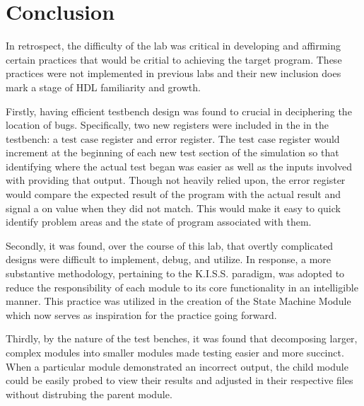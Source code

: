 \documentclass[stu,12pt,floatsintext]{apa7}
\begin{document}
\section{Conclusion}

%
%

In retrospect, the difficulty of the lab was critical in developing and affirming certain practices that would be critial to achieving the target program. These practices were not implemented in previous labs and their new inclusion does mark a stage of HDL familiarity and growth.

Firstly, having efficient testbench design was found to crucial in deciphering the location of bugs. Specifically, two new registers were included in the in the testbench: a \(\text{test case}\) register and \(\text{error}\) register. The \(\text{test case}\) register would increment at the beginning of each new test section of the simulation so that identifying where the actual test began was easier as well as the inputs involved with providing that output. Though not heavily relied upon, the \(\text{error}\) register would compare the expected result of the program with the actual result and signal a on value when they did not match. This would make it easy to quick identify problem areas and the state of program associated with them.

Secondly, it was found, over the course of this lab, that overtly complicated designs were difficult to implement, debug, and utilize. In response, a more substantive methodology, pertaining to the K.I.S.S. paradigm, was adopted to reduce the responsibility of each module to its core functionality in an intelligible manner. This practice was utilized in the creation of the State Machine Module which now serves as inspiration for the practice going forward.

Thirdly, by the nature of the test benches, it was found that decomposing larger, complex modules into smaller modules made testing easier and more succinct. When a particular module demonstrated an incorrect output, the child module could be easily probed to view their results and adjusted in their respective files without distrubing the parent module.
\end{document}
